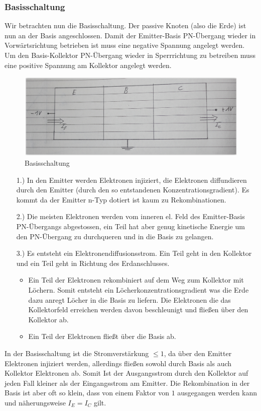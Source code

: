 \documentclass[12pt,a4paper]{report}%
\numberwithin{equation}{section}
\numberwithin{equation}{subsection}
\begin{document}
    \subsubsection{Basisschaltung}
  Wir betrachten nun die Basisschaltung. Der passive Knoten (also die Erde) ist nun an der Basis angeschlossen. Damit der Emitter-Basis PN-Übergang wieder in Vorwärtsrichtung betrieben ist muss eine negative Spannung angelegt werden. Um den Basis-Kollektor PN-Übergang wieder in Sperrrichtung zu betreiben muss eine positive Spannung am Kollektor angelegt werden.
    \begin{figure}[H]
			  \centering
			  \captionsetup{justification=centering}
			  \includegraphics[width=0.6\linewidth]{bpt_basissch.png}
			  \caption{Basisschaltung}
			  \label{fig:bpt_basissch}
			\end{figure}
    \begin{itemize}
      \item[1.) ] In den Emitter werden Elektronen injiziert, die Elektronen diffundieren durch den Emitter (durch den so entstandenen Konzentrationsgradient). Es kommt da der Emitter n-Typ dotiert ist kaum zu Rekombinationen. 
      \item[2.) ] Die meisten Elektronen werden vom inneren el. Feld des Emitter-Basis PN-Übergangs abgestossen, ein Teil hat aber genug kinetische Energie um den PN-Übergang zu durchqueren und in die Basis zu gelangen.
      \item[3.) ] Es entsteht ein Elektronendiffusionsstrom. Ein Teil geht in den Kollektor und ein Teil geht in Richtung des Erdanschlusses.
        \begin{itemize}
          \item Ein Teil der Elektronen rekombiniert auf dem Weg zum Kollektor mit Löchern. Somit entsteht ein Löcherkonzentrationsgradient was die Erde dazu anregt Löcher in die Basis zu liefern. Die Elektronen die das Kollektorfeld erreichen werden davon beschleunigt und fließen über den Kollektor ab.
          \item Ein Teil der Elektronen fließt über die Basis ab.
        \end{itemize}
    \end{itemize}
    In der Basisschaltung ist die Stromverstärkung $\leq 1$, da über den Emitter Elektronen injiziert werden, allerdings fließen sowohl durch Basis als auch Kollektor Elektronen ab. Somit Ist der Ausgangsstrom durch den Kollektor auf jeden Fall kleiner als der Eingangsstrom am Emitter. Die Rekombination in der Basis ist aber oft so klein, dass von einem Faktor von $1$ ausgegangen werden kann und näherungsweise $I_E = I_C$ gilt.
\end{document}
